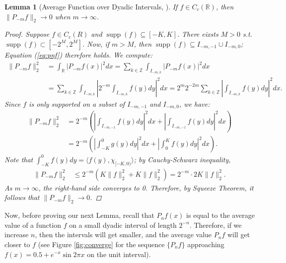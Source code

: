\documentclass[11pt]{amsart}
\theoremstyle{theorem} %
\newtheorem{lem}[thm]{Lemma} %
\theoremstyle{definition}
\theoremstyle{example}
\theoremstyle{remark}
\numberwithin{equation}{section}
\newcommand{\R}{\mathbb{R}}
\newcommand{\Z}{\mathbb{Z}}
\DeclareMathOperator*{\supp}{supp}
\begin{document}
\begin{lem}[Average Function over Dyadic Intervals, {\cite[295]{pinsky}}] \label{lem:average}
	If $ f \in C_c(\R) $, then $ \|P_{-m}f\|_2 \to 0 $ when $ m \to \infty $.
	
	\begin{proof}
		Suppose $ f \in C_c(R) $ and $ \supp(f) \subseteq [-K,K] $. There eixsts $ M > 0 $ s.t. $ \supp(f) \subset [-2^M, 2^M] $. Now, if $ m > M $, then $ \supp(f) \subseteq I_{-m,-1} \cup I_{-m,0} $; Equation (\ref{eq:pnf}) therefore holds.
		We compute:
		\begin{align*}
			\| P_{-m}f \|_2^2 &= \int_{\R} \left| P_{-m}f(x) \right|^2 dx 
			= \sum_{k \in \Z} \int_{I_{-m,k}} |P_{-m}f(x)|^2 dx \\
			&= \sum_{k \in \Z} \int_{I_{-m,k}} \left|2^{-m} \int_{I_{-m,k}} f(y) dy \right|^2 dx
			= 2^{m}  2^{-2m} \sum_{k \in \Z} \left|\int_{I_{-m,k}} f(y) dy \right|^2 dx.
		\end{align*}
		Since $ f $ is only supported on a subset of $ I_{-m,-1} $ and $ I_{-m,0} $, we have:
		\begin{align*}
		\| P_{-m}f \|_2^2	&= 2^{-m} \left( \left|\int_{I_{-m,-1}} f(y) dy \right|^2 dx + \left| \int_{I_{-m,-1}} f(y) dy \right|^2 dx \right) \\
			&=  2^{-m} \left( \left|\int_{-K}^0 g(y) dy \right|^2 dx + \left| \int_{0}^K f(y) dy \right|^2 dx \right).
		\end{align*}
		Note that $ \int_{-K}^0 f(y) dy = \langle f(y),\chi_{[-K,0)}  \rangle $; by Cauchy-Schwarz inequality,
		\begin{align*}
		\| P_{-m}f \|_2^2	&\leq  2^{-m} \left( K \|f\|_2^2 + K \|f\|_2^2 \right) = 2^{-m} \cdot 2K \|f\|_2^2.
		\end{align*}
		As $ m \to \infty $, the right-hand side converges to 0. Therefore, by Squeeze Theorem, it follows that $ \|P_{-m}f\|_2 \to 0 $.
	\end{proof}
\end{lem}

Now, before proving our next Lemma, recall that $ P_nf(x) $ is equal to the average value of a function $ f $ on a small dyadic interval of length $ 2^{-n} $. Therefore, if we increase $ n $, then the intervals will get smaller, and the average value $ P_nf $ will get closer to $ f $ (see Figure \ref{fig:converge} for the sequence $ \{P_nf\} $ approaching $ f(x) = 0.5 + e^{-x} \sin{2\pi x} $ on the unit interval). 
\end{document}
